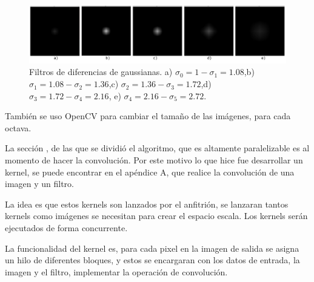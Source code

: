 \begin{figure}[h]
			\centering
				\includegraphics[scale=0.2]{img/DoG.jpg}
			\caption{Filtros de diferencias de gaussianas. a) $\sigma_{0}=1-\sigma_{1}=1.08$,b) $\sigma_{1}=1.08-\sigma_{2}=1.36$,c) $\sigma_{2}=1.36-\sigma_{3}=1.72$,d) $\sigma_{3}=1.72-\sigma_{4}=2.16$, e) $\sigma_{4}=2.16-\sigma_{5}=2.72$. }
\end{figure}


También se uso OpenCV para cambiar el tamaño de las imágenes, para cada octava.

La sección , de las que se dividió el algoritmo, que es altamente paralelizable es al momento de hacer la convolución. Por este motivo lo que hice fue desarrollar un kernel, se puede encontrar en el apéndice A, que realice la convolución de una imagen y un filtro.

 
La idea es que estos kernels son lanzados por el anfitrión, se lanzaran tantos kernels como imágenes se necesitan para crear el espacio escala. Los kernels serán ejecutados de forma concurrente. 

La funcionalidad del kernel es, para cada pixel en la imagen de salida se asigna un hilo de diferentes bloques, y estos se encargaran con los datos de entrada, la imagen y el filtro, implementar la operación de convolución.\\

